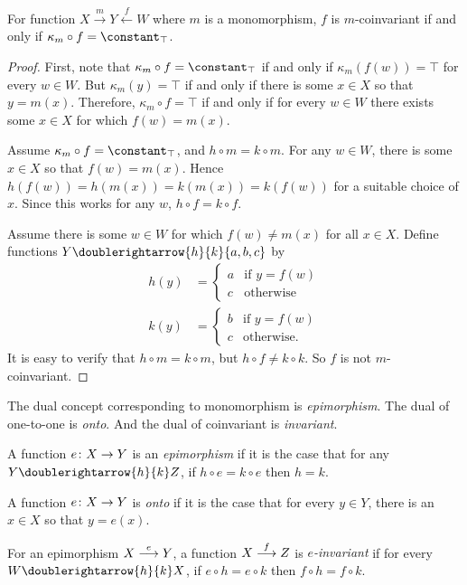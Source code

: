 \begin{lemma}
	For function $X\stackrel{m}{\longrightarrow}Y\stackrel{f}{\longleftarrow}W$ where $m$ is a monomorphism, $f$ is $m$-coinvariant if and only if $\kappa_m\circ f = \constant_\top$.

\begin{proof}
	First, note that $\kappa_m\circ f = \constant_\top$ if and only if
	$\kappa_m(f(w))=\top$ for every $w\in W$. But $\kappa_m(y)=\top$ if and only if there is some $x\in X$ so that $y=m(x)$. Therefore, $\kappa_m\circ f=\top$ if and only if for every $w\in W$ there exists some $x\in X$ for which $f(w)=m(x)$.
	
	Assume $\kappa_m\circ f=\constant_\top$, and $h\circ m = k\circ m$. For any $w\in W$, there is some $x\in X$ so that $f(w)=m(x)$. Hence $h(f(w)) = h(m(x)) = k(m(x)) = k(f(w))$ for a suitable choice of $x$. 
	Since this works for any $w$, $h\circ f=k\circ f$. 
	
	Assume there is some $w\in W$ for which $f(w)\neq m(x)$ for all $x\in X$. Define functions $Y\doublerightarrow{h}{k}\{a,b,c\}$ by 
	\begin{align*}h(y) &= \begin{cases}
				a &\text{if $y=f(w)$}\\
				c &\text{otherwise}
	\end{cases}\\
	k(y) &= \begin{cases}
	b & \text{if $y=f(w)$}\\
	c &\text{otherwise.}
	\end{cases}
	\end{align*}
	It is easy to verify that $h\circ m = k\circ m$, but $h\circ f \neq k\circ k$. So $f$ is not $m$-coinvariant.
\end{proof}
\end{lemma}

The dual concept corresponding to monomorphism is \emph{epimorphism}. The dual of one-to-one is \emph{onto}. And the dual of coinvariant is \emph{invariant}.

\begin{defn}
	A function $\fromto eXY$ is an \emph{epimorphism} if it is the case that for any $Y\doublerightarrow{h}{k}Z$, if $h\circ e=k\circ e$ then $h=k$.
	
	A function $\fromto eXY$ is \emph{onto} if it is the case that for every $y\in Y$, there is an $x\in X$ so that $y=e(x)$.
	
	For an epimorphism $\sfromto eXY$, a function $\sfromto fXZ$ is \emph{$e$-invariant} if for every $W\doublerightarrow{h}{k}X$, if $e\circ h=e\circ k$ then $f\circ h=f\circ k$.
	
\end{defn}

